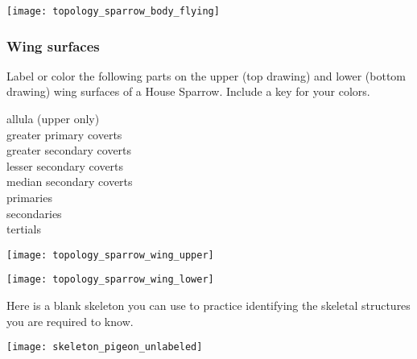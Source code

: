 \documentclass[10pt]{article}
\begin{document}
\vspace{\baselineskip}

\begin{center}
\texttt{[image: topology\_sparrow\_body\_flying]}
\end{center}

\newpage

\subsubsection*{Wing surfaces}

Label or color the following parts on the upper (top drawing) and lower (bottom drawing) wing surfaces of a House Sparrow. Include a key for your colors.


\begin{multicols}{3}
allula (upper only)\\
greater primary coverts\\
greater secondary coverts\\
lesser secondary coverts\\
median secondary coverts\\
primaries\\
secondaries\\
tertials
\end{multicols}

\vspace{\baselineskip}

\begin{center}
\texttt{[image: topology\_sparrow\_wing\_upper]}

\vspace{0.5in}

\texttt{[image: topology\_sparrow\_wing\_lower]}

\end{center}

%
%
%
%
%
%

\newpage

Here is a blank skeleton you can use to practice identifying the skeletal structures you are required to know.

\vfill

\begin{center}
	\texttt{[image: skeleton\_pigeon\_unlabeled]}
	
\end{center}

\vfill
\end{document}
